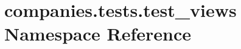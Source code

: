 \hypertarget{namespacecompanies_1_1tests_1_1test__views}{\section{companies.\-tests.\-test\-\_\-views Namespace Reference}
\label{namespacecompanies_1_1tests_1_1test__views}
}
